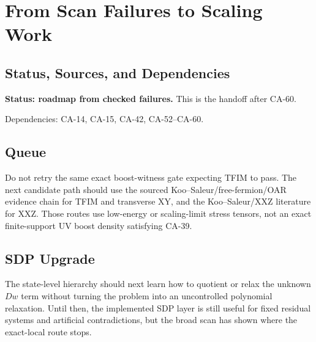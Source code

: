
\section{From Scan Failures to Scaling Work}
\label{sec:qubit-scan-to-scaling-queue}

\subsection{Status, Sources, and Dependencies}

\textbf{Status: roadmap from checked failures.}  This is the handoff after
CA-60.

Dependencies: CA-14, CA-15, CA-42, CA-52--CA-60.


\subsection{Queue}

Do not retry the same exact boost-witness gate expecting TFIM to pass.  The
next candidate path should use the sourced Koo--Saleur/free-fermion/OAR
evidence chain for TFIM and transverse XY, and the Koo--Saleur/XXZ literature
for XXZ.  Those routes use low-energy or scaling-limit stress tensors, not an
exact finite-support UV boost density satisfying CA-39.

\subsection{SDP Upgrade}

The state-level hierarchy should next learn how to quotient or relax the
unknown \(Dw\) term without turning the problem into an uncontrolled
polynomial relaxation.  Until then, the implemented SDP layer is still useful
for fixed residual systems and artificial contradictions, but the broad scan
has shown where the exact-local route stops.
